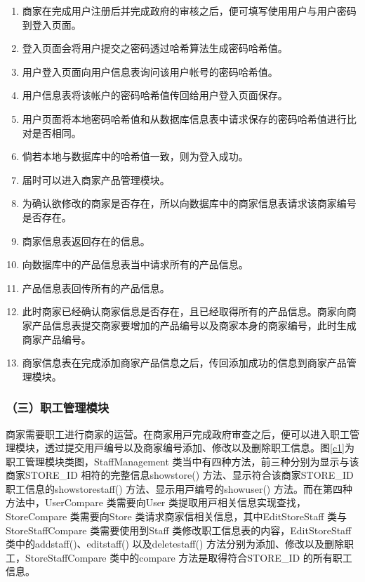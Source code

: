 	\begin{enumerate}
	\item 商家在完成用户注册后并完成政府的审核之后，便可填写使用用户与用户密码到登入页面。
	\item 登入页面会将用户提交之密码透过哈希算法生成密码哈希值。
	\item 用户登入页面向用户信息表询问该用户帐号的密码哈希值。
	\item 用户信息表将该帐户的密码哈希值传回给用户登入页面保存。
	\item 用户页面将本地密码哈希值和从数据库信息表中请求保存的密码哈希值进行比对是否相同。
	\item 倘若本地与数据库中的哈希值一致，则为登入成功。
	\item 届时可以进入商家产品管理模块。
	\item 为确认欲修改的商家是否存在，所以向数据库中的商家信息表请求该商家编号是否存在。
	\item 商家信息表返回存在的信息。
	\item 向数据库中的产品信息表当中请求所有的产品信息。
	\item 产品信息表回传所有的产品信息。
	\item 此时商家已经确认商家信息是否存在，且已经取得所有的产品信息。商家向商家产品信息表提交商家要增加的产品编号以及商家本身的商家编号，此时生成商家产品编号。
	\item 商家信息表在完成添加商家产品信息之后，传回添加成功的信息到商家产品管理模块。
	\end{enumerate}


\subsubsection{（三）职工管理模块}
商家需要职⼯进⾏商家的运营。在商家⽤⼾完成政府审查之后，便可以进⼊职⼯管理模块，透过提交⽤⼾编号以及商家编号添加、修改以及删除职⼯信息。图\ref{c1}为职⼯管理模块类图，StaffManagement 类当中有四种⽅法，前三种分别为显⽰与该商家STORE\_ID 相符的完整信息showstore() ⽅法、显⽰符合该商家STORE\_ID 职⼯信息的showstorestaff() ⽅法、显⽰⽤⼾编号的showuser() ⽅法。而在第四种方法中，UserCompare 类需要向User 类提取⽤⼾相关信息实现查找，StoreCompare 类需要向Store 类请求商家信相关信息，其中EditStoreStaff 类与StoreStaffCompare 类需要使⽤到Staff 类修改职⼯信息表的内容，EditStoreStaff 类中的addstaff()、editstaff() 以及deletestaff() ⽅法分别为添加、修改以及删除职⼯，StoreStaffCompare 类中的compare ⽅法是取得符合STORE\_ID 的所有职⼯信息。

